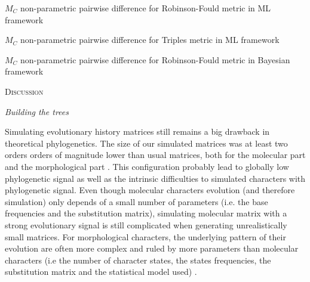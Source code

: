 \documentclass[12pt,letterpaper]{article}
\renewcommand{\section}[1]{%
\bigskip
\begin{center}
\begin{Large}
\normalfont\scshape #1
\medskip
\end{Large}
\end{center}}
\renewcommand{\subsection}[1]{%
\bigskip
\begin{center}
\begin{large}
\normalfont\itshape #1
\end{large}
\end{center}}
\begin{document}
\begin{table}
  \centering
  \linespread{1.0}
  \caption{$M_C$ non-parametric pairwise difference for Robinson-Fould metric in ML framework} %
  
  \label{ML_RF-MC_results}
\end{table}

\begin{table}
  \centering
  \linespread{1.0}
  \caption{$M_C$ non-parametric pairwise difference for Triples metric in ML framework} %
  
  \label{ML_Tr-MC_results}
\end{table}

\begin{table}
  \centering
  \linespread{1.0}
  \caption{$M_C$ non-parametric pairwise difference for Robinson-Fould metric in Bayesian framework}
  
  \label{Ba_RF-MC_results}
\end{table}

%
%

\section{Discussion}


\subsection{Building the trees}
Simulating evolutionary history matrices still remains a big drawback in theoretical phylogenetics. %
The size of our simulated matrices was at least two orders orders of magnitude lower than usual matrices, both for the molecular part \citep[e.g.][]{springermacroevolutionary2012} and the morphological part \citep[e.g.][]{nithe2013}. %
This configuration probably lead to globally low phylogenetic signal as well as the intrinsic difficulties to simulated characters with phylogenetic signal.
Even though molecular characters evolution (and therefore simulation) only depends of a small number of parameters (i.e. the base frequencies and the substitution matrix), simulating molecular matrix with a strong evolutionary signal is still complicated when generating unrealistically small matrices.
For morphological characters, the underlying pattern of their evolution are often more complex and ruled by more parameters than molecular characters (i.e the number of character states, the states frequencies, the substitution matrix and the statistical model used) \citep{Pagel22011994,wagner2000,lewisa2001}.
\end{document}

